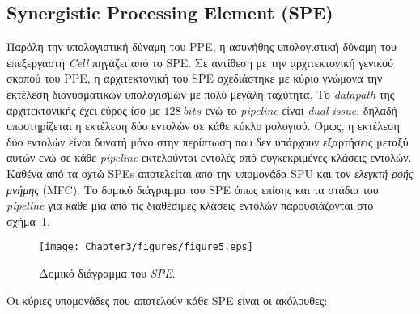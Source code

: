 \subsection[3.2.2 Synergistic Processing Element (SPE)]{Synergistic Processing Element (SPE)}
\label{subsection:sub322}
\indent
Παρόλη την υπολογιστική δύναμη του \ac{PPE}, η ασυνήθης υπολογιστική δύναμη του επεξεργαστή \textsl{Cell} πηγάζει από το \acf{SPE}. Σε αντίθεση με την αρχιτεκτονική γενικού σκοπού του \ac{PPE}, η αρχιτεκτονική του \ac{SPE} σχεδιάστηκε με κύριο γνώμονα την εκτέλεση διανυσματικών υπολογισμών με πολύ μεγάλη ταχύτητα. Το \textsl{datapath} της αρχιτεκτονικής έχει εύρος ίσο με \(128\ bits\) ενώ το \textsl{pipeline} είναι \textsl{dual-issue}, δηλαδή υποστηρίζεται η εκτέλεση δύο εντολών σε κάθε κύκλο ρολογιού. Όμως, η εκτέλεση δύο εντολών είναι δυνατή μόνο στην περίπτωση που δεν υπάρχουν εξαρτήσεις μεταξύ αυτών ενώ σε κάθε \textsl{pipeline} εκτελούνται εντολές από συγκεκριμένες κλάσεις εντολών. Καθένα από τα οχτώ \acp{SPE} αποτελείται από την υπομονάδα \ac{SPU} και τον \textsl{ελεγκτή ροής μνήμης} (\ac{MFC}). Το δομικό διάγραμμα του \ac{SPE} όπως επίσης και τα στάδια του \textsl{pipeline} για κάθε μία από τις διαθέσιμες κλάσεις εντολών παρουσιάζονται στο σχήμα~\ref{figure:fig35}.

\begin{figure}
\centering
\texttt{[image: Chapter3/figures/figure5.eps]}
\caption{Δομικό διάγραμμα του \textsl{SPE}.}
\label{figure:fig35}
\end{figure}
\indent
Οι κύριες υπομονάδες που αποτελούν κάθε \ac{SPE} είναι οι ακόλουθες:

